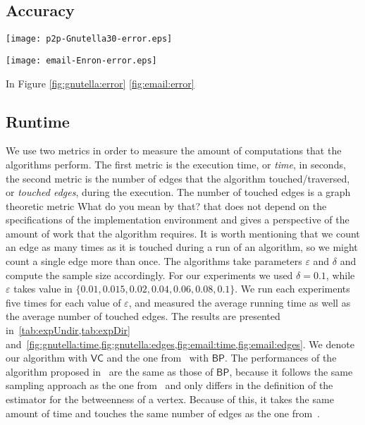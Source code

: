 \subsection{Accuracy}\label{sec:accuracy}

\begin{figure*}
\begin{minipage}[b]{0.5\linewidth}
\flushleft
\texttt{[image: p2p-Gnutella30-error.eps]}
\caption{\XXX} \label{fig:gnutella:error}
\end{minipage}%
\begin{minipage}[b]{0.5\linewidth}
\centering
\texttt{[image: email-Enron-error.eps]}
\caption{\XXX} \label{fig:email:error}
\end{minipage}
\end{figure*}
In Figure \ref{fig:gnutella:error} \ref{fig:email:error}

\subsection{Runtime}\label{sec:runtime}
We use two metrics in order to measure the amount of computations that the
algorithms perform. The first metric is the execution time, or \textit{time}, in
seconds, the second metric is the number of edges that the algorithm
touched/traversed, or \textit{touched edges}, during the execution.  The number
of touched edges is a graph theoretic metric \XXX What do you mean by that? that
does not depend on the specifications of the implementation environment and
gives a perspective of the amount of work that the algorithm requires. It is
worth mentioning that we count an edge as many times as it is touched during
a run of an algorithm, so we might count a single edge more than once. The
algorithms take parameters $\varepsilon$ and $\delta$ and compute the sample
size accordingly. For our experiments we used $\delta=0.1$, while $\varepsilon$
takes value in $\{0.01, 0.015, 0.02, 0.04, 0.06, 0.08, 0.1\}$. We run each
experiments five times for each value of $\varepsilon$, and measured the average
running time as well as the average number of touched edges. 
The results are presented in~\cref{tab:expUndir,tab:expDir}
and~\cref{fig:gnutella:time,fig:gnutella:edges,fig:email:time,fig:email:edges}.
We denote our algorithm with $\mathsf{VC}$ and the one from~\citep{BrandesP07}
with $\mathsf{BP}$. The performances of the algorithm proposed
in~\citep{GeisbergerSS08} are the same as those of $\mathsf{BP}$, because it
follows the same sampling approach as the one
from~\citep{BrandesP07,JacobKLPT05} and only differs in the definition of the
estimator for the betweenness of a vertex. Because of this, it takes the same
amount of time and touches the same number of edges as the one
from~\citep{BrandesP07}.

